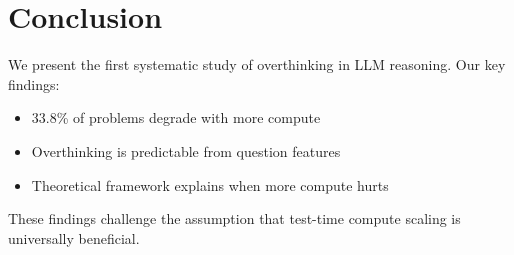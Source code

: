 \section{Conclusion}

We present the first systematic study of overthinking in LLM reasoning. Our key findings:
\begin{itemize}
\item 33.8\% of problems degrade with more compute
\item Overthinking is predictable from question features
\item Theoretical framework explains when more compute hurts
\end{itemize}

These findings challenge the assumption that test-time compute scaling is universally beneficial.
